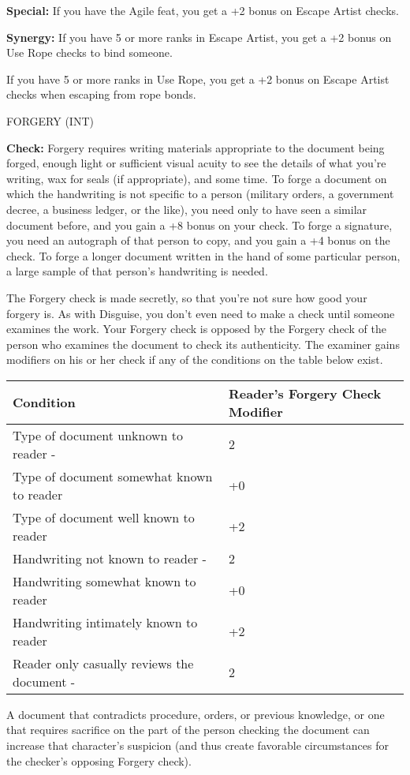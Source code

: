 \documentclass{article}
\begin{document}
\textbf{Special:} If you have the Agile feat, you get a +2 bonus on Escape Artist 
checks.

\textbf{Synergy:} If you have 5 or more ranks in Escape Artist, you get a +2 bonus 
on Use Rope checks to bind someone.

If you have 5 or more ranks in Use Rope, you get a +2 bonus on Escape Artist checks 
when escaping from rope bonds.

\vspace{12pt}
FORGERY (INT)

\textbf{Check:} Forgery requires writing materials appropriate to the document 
being forged, enough light or sufficient visual acuity to see the details of what 
you're writing, wax for seals (if appropriate), and some time. To forge a document 
on which the handwriting is not specific to a person (military orders, a government 
decree, a business ledger, or the like), you need only to have seen a similar document 
before, and you gain a +8 bonus on your check. To forge a signature, you need an 
autograph of that person to copy, and you gain a +4 bonus on the check. To forge 
a longer document written in the hand of some particular person, a large sample 
of that person's handwriting is needed.

The Forgery check is made secretly, so that you're not sure how good your forgery 
is. As with Disguise, you don't even need to make a check until someone examines 
the work. Your Forgery check is opposed by the Forgery check of the person who 
examines the document to check its authenticity. The examiner gains modifiers on 
his or her check if any of the conditions on the table below exist.

\vspace{12pt}
\begin{tabular}{|>{\raggedright}p{182pt}|>{\raggedright}p{77pt}|}
\hline
C\textbf{ondition } & R\textbf{eader's Forgery Check Modifier}\tabularnewline
\hline
Type of document unknown to reader - & 2\tabularnewline
\hline
Type of document somewhat known to reader  & +0\tabularnewline
\hline
Type of document well known to reader  & +2\tabularnewline
\hline
Handwriting not known to reader - & 2\tabularnewline
\hline
Handwriting somewhat known to reader  & +0\tabularnewline
\hline
Handwriting intimately known to reader  & +2\tabularnewline
\hline
Reader only casually reviews the document - & 2\tabularnewline
\hline
\end{tabular}

\vspace{12pt}
A document that contradicts procedure, orders, or previous knowledge, or one that 
requires sacrifice on the part of the person checking the document can increase 
that character's suspicion (and thus create favorable circumstances for the checker's 
opposing Forgery check).
\end{document}
